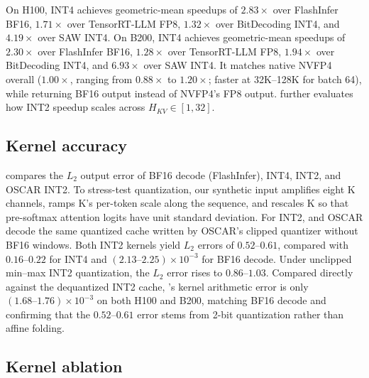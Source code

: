 On H100, \sys{} INT4 achieves geometric-mean speedups of $2.83\times$ over FlashInfer BF16, $1.71\times$ over TensorRT-LLM FP8, $1.32\times$ over BitDecoding INT4, and $4.19\times$ over SAW INT4.
On B200, \sys{} INT4 achieves geometric-mean speedups of $2.30\times$ over FlashInfer BF16, $1.28\times$ over TensorRT-LLM FP8, $1.94\times$ over BitDecoding INT4, and $6.93\times$ over SAW INT4.
It matches native NVFP4 overall ($1.00\times$, ranging from $0.88\times$ to $1.20\times$; faster at 32K--128K for batch 64), while returning BF16 output instead of NVFP4's FP8 output.
 further evaluates how \sys{} INT2 speedup scales across $H_{KV}\in[1,32]$.



\subsection{Kernel accuracy}
\label{sec:eval-accuracy}



 compares the $L_2$ output error of BF16 decode (FlashInfer), \sys{} INT4, \sys{} INT2, and OSCAR INT2.
To stress-test quantization, our synthetic input amplifies eight K channels, ramps K's per-token scale along the sequence, and rescales K so that pre-softmax attention logits have unit standard deviation.
For INT2, \sys{} and OSCAR decode the same quantized cache written by OSCAR's clipped quantizer without BF16 windows.
Both INT2 kernels yield $L_2$ errors of $0.52$--$0.61$, compared with $0.16$--$0.22$ for \sys{} INT4 and $(2.13\text{--}2.25)\times10^{-3}$ for BF16 decode.
Under unclipped min--max INT2 quantization, the $L_2$ error rises to $0.86$--$1.03$.
Compared directly against the dequantized INT2 cache, \sys{}'s kernel arithmetic error is only $(1.68\text{--}1.76)\times10^{-3}$ on both H100 and B200, matching BF16 decode and confirming that the $0.52$--$0.61$ error stems from 2-bit quantization rather than affine folding.

\subsection{Kernel ablation}
\label{sec:eval-ablation}

